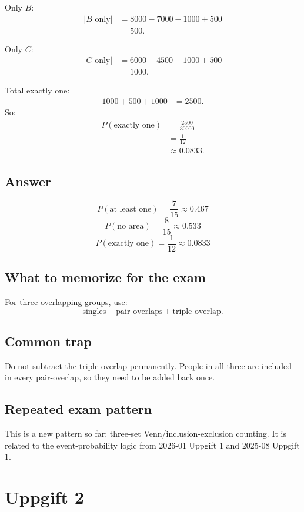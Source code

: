 \documentclass[11pt,a4paper]{article}
\begin{document}
Only \(B\):
\begin{align*}
|B\text{ only}|
&=8000-7000-1000+500\\
&=500.
\end{align*}

Only \(C\):
\begin{align*}
|C\text{ only}|
&=6000-4500-1000+500\\
&=1000.
\end{align*}

Total exactly one:
\begin{align*}
1000+500+1000&=2500.
\end{align*}
So:
\begin{align*}
P(\text{exactly one})
&=\frac{2500}{30000}\\
&=\frac{1}{12}\\
&\approx 0.0833.
\end{align*}

\subsection*{Answer}
\[
\boxed{P(\text{at least one})=\frac{7}{15}\approx 0.467}
\]
\[
\boxed{P(\text{no area})=\frac{8}{15}\approx 0.533}
\]
\[
\boxed{P(\text{exactly one})=\frac{1}{12}\approx 0.0833}
\]

\subsection*{What to memorize for the exam}
For three overlapping groups, use:
\[
\text{singles} - \text{pair overlaps} + \text{triple overlap}.
\]

\subsection*{Common trap}
Do not subtract the triple overlap permanently. People in all three are included in every pair-overlap, so they need to be added back once.

\subsection*{Repeated exam pattern}
This is a new pattern so far: three-set Venn/inclusion-exclusion counting. It is related to the event-probability logic from 2026-01 Uppgift 1 and 2025-08 Uppgift 1.

\section*{Uppgift 2}
\end{document}
